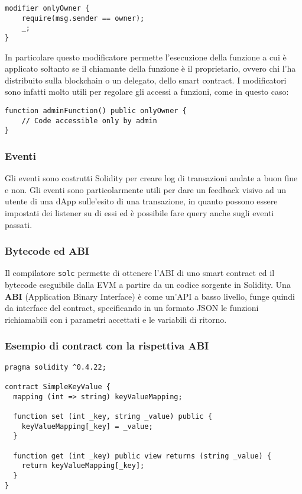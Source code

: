 \begin{lstlisting}[language=Solidity, numbers=none]
modifier onlyOwner {
    require(msg.sender == owner);
    _;
}
\end{lstlisting}

In particolare questo modificatore permette l'esecuzione della funzione a cui è applicato soltanto se il chiamante
della funzione è il proprietario, ovvero chi l'ha distribuito sulla blockchain o un delegato, dello smart contract.
I modificatori sono infatti molto utili per regolare gli accessi a funzioni, come in questo caso:

\begin{lstlisting}[language=Solidity, numbers=none]
function adminFunction() public onlyOwner {
    // Code accessible only by admin
}
\end{lstlisting}

\subsubsection{Eventi}

Gli eventi sono costrutti Solidity per creare log di transazioni andate a
buon fine e non. Gli eventi sono particolarmente utili per dare un feedback visivo ad un
utente di una dApp sulle'esito di una transazione, in quanto possono essere impostati dei
listener su di essi ed è possibile fare query anche sugli eventi passati.

\subsubsection{Bytecode ed ABI}

Il compilatore \texttt{solc} permette di ottenere l'ABI di uno smart contract ed il bytecode eseguibile dalla EVM
a partire da un codice sorgente in Solidity.
Una \textbf{ABI} (Application Binary Interface) è come un'API a basso livello, funge quindi da interface del contract,
specificando in un formato JSON le funzioni richiamabili con i parametri accettati e le variabili di ritorno.

\subsubsection{Esempio di contract con la rispettiva ABI}

\begin{lstlisting}[language=Solidity, numbers=none]
pragma solidity ^0.4.22;

contract SimpleKeyValue {
  mapping (int => string) keyValueMapping;

  function set (int _key, string _value) public {
    keyValueMapping[_key] = _value;
  }

  function get (int _key) public view returns (string _value) {
    return keyValueMapping[_key];
  }
}
\end{lstlisting}

